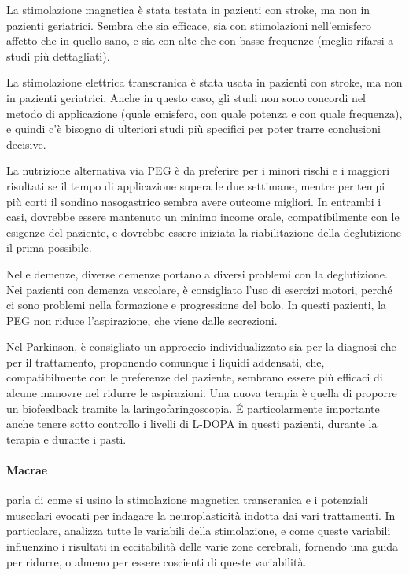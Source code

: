La stimolazione magnetica è stata testata in pazienti con stroke, ma non in 
pazienti geriatrici.
Sembra che sia efficace, sia con stimolazioni nell'emisfero affetto che in 
quello sano, e sia con alte che con basse frequenze (meglio rifarsi a studi più 
dettagliati).

La stimolazione elettrica transcranica è stata usata in pazienti con stroke, ma 
non in pazienti geriatrici.
Anche in questo caso, gli studi non sono concordi nel metodo di applicazione 
(quale emisfero, con quale potenza e con quale frequenza), e quindi c'è bisogno 
di ulteriori studi più specifici per poter trarre conclusioni decisive.

La nutrizione alternativa via PEG è da preferire per i minori rischi e i 
maggiori risultati se il tempo di applicazione supera le due settimane, mentre 
per tempi più corti il sondino nasogastrico sembra avere outcome migliori.
In entrambi i casi, dovrebbe essere mantenuto un minimo income orale, 
compatibilmente con le esigenze del paziente, e dovrebbe essere iniziata la 
riabilitazione della deglutizione il prima possibile.

Nelle demenze, diverse demenze portano a diversi problemi con la deglutizione.
Nei pazienti con demenza vascolare, è consigliato l'uso di esercizi motori, 
perché ci sono problemi nella formazione e progressione del bolo.
In questi pazienti, la PEG non riduce l'aspirazione, che viene dalle secrezioni.

Nel Parkinson, è consigliato un approccio individualizzato sia per la diagnosi 
che per il trattamento, proponendo comunque i liquidi addensati, che, 
compatibilmente con le preferenze del paziente, sembrano essere più efficaci di 
alcune manovre nel ridurre le aspirazioni.
Una nuova terapia è quella di proporre un biofeedback tramite la 
laringofaringoscopia.
\'E particolarmente importante anche tenere sotto controllo i livelli di L-DOPA 
in questi pazienti, durante la terapia e durante i pasti.

\paragraph{Macrae}\label{par:mac} \cite{Macrae2014} parla di come si usino la 
stimolazione magnetica transcranica e i potenziali muscolari evocati per 
indagare la neuroplasticità indotta dai vari trattamenti.
In particolare, analizza tutte le variabili della stimolazione, e come queste 
variabili influenzino i risultati in eccitabilità delle varie zone cerebrali, 
fornendo una guida per ridurre, o almeno per essere coscienti di queste 
variabilità.

